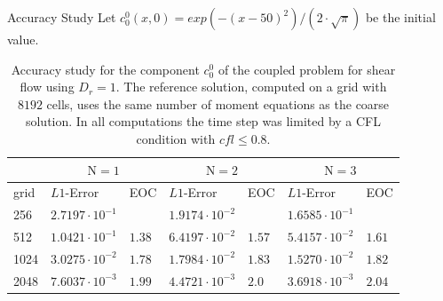 \begin{frame}{Accuracy Study}
\scriptsize
Let  $c^0_0(x,0) = exp(-(x-50)^2)/(2 \cdot \sqrt{\pi})$ be the initial value.
\vspace{5mm}
\begin{table}[ht]
	\centering
	\begin{tabular}{|l|l|l|l|l|l|l|}
		\hline 
		& \multicolumn{2}{|c|}{$\mathrm{N}=1$} & \multicolumn{2}{|c|}{$\mathrm{N}=2$} & \multicolumn{2}{|c|}{$\mathrm{N}=3$} \\
		\hline 
		grid & $L1$-Error & EOC  & $L1$-Error & EOC  & $L1$-Error & EOC  \\
		\hline
		256 & $2.7197  \cdot 10^{-1}$ & & $1.9174\cdot 10^{-2}$&&$1.6585 \cdot 10^{-1}$&\\
		\hline
		512 & $1.0421 \cdot 10^{-1}$ &$1.38$ & $6.4197 \cdot 10^{-2}$&$1.57$&$ 5.4157 \cdot 10^{-2}$&$1.61$\\
		\hline 
		1024  &$3.0275 \cdot 10^{-2}$&$1.78$& $1.7984 \cdot 10^{-2}$&$1.83$&$ 1.5270 \cdot 10^{-2}$& $1.82$\\
		\hline
		2048 & $ 7.6037 \cdot 10^{-3}$ &$1.99$& $4.4721 \cdot 10^{-3}$&$2.0$&$3.6918 \cdot 10^{-3}$&$2.04$\\
		\hline
	\end{tabular}
	\caption{Accuracy study for the component $c^0_0$ of the coupled problem for shear flow using $D_r=1$. The reference solution, computed on a grid with $8192$ cells, uses the same number of moment equations as the coarse solution.  In all computations the time step was limited by a CFL condition with $cfl \leq 0.8$.}
	\label{tab:Dr=1_error_N=1,2,3vsN=1,2,3}
\end{table}
\end{frame}


